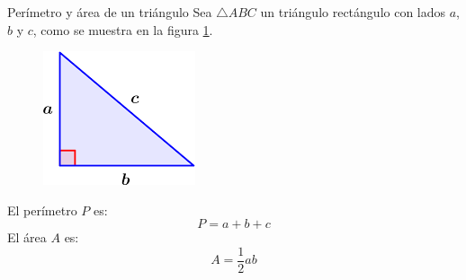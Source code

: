\begin{infocard}{Perímetro y área de un triángulo}
Sea $\triangle ABC$ un triángulo rectángulo con lados $a$, $b$ y $c$, como se muestra en la figura \ref{fig:20230402132954}.

\begin{multicols}{2}
    \begin{figure}[H]
        \centering
        \includegraphics[width=0.9\linewidth]{../images/triangulo_perimetro.png}
        \caption{}
        \label{fig:20230402132954}
    \end{figure}
        El perímetro $P$ es:
        \[P=a+b+c\]
        El área $A$ es:
        \[A=\frac{1}{2}ab\]
\end{multicols}
\end{infocard}